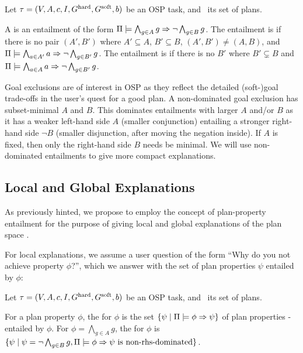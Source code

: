 \begin{definition}
Let $\tau =
(V,\allowbreak A,\allowbreak{\ensuremath{c}},\allowbreak I,\allowbreak G^{\text{\textup{hard}}},\allowbreak G^{\text{\textup{soft}}},\allowbreak{\ensuremath{b}})$
be an OSP task, and \plans\ its set of plans.

A  is an entailment of the form
$\Pi \models \bigwedge_{g \in A} g \Rightarrow \neg \bigwedge_{g \in B}
  g$. 
%
The entailment is  if there is no pair
$(A',B')$ where $A' \subseteq A$, $B' \subseteq B$, $(A',B') \neq
(A,B)$, and $\Pi \models \bigwedge_{a \in A'} a \Rightarrow \neg
  \bigwedge_{g \in B'} g$.
%
The entailment is  if there is no $B'$
where $B' \subsetneq B$ and $\Pi \models \bigwedge_{a \in A}
  a \Rightarrow \neg \bigwedge_{g \in B'} g$.
\end{definition}

Goal exclusions are of interest in OSP as they reflect the detailed
(soft-)goal trade-offs in the user's quest for a good plan. A
non-dominated goal exclusion has subset-minimal $A$ and $B$. This
dominates entailments with larger $A$ and/or $B$ as it has a weaker
left-hand side $A$ (smaller conjunction) entailing a stronger
right-hand side $\neg B$ (smaller disjunction, after moving the
negation inside). If $A$ is fixed, then only the right-hand side $B$
needs be minimal. We will use non-dominated entailments to give more
compact explanations.



\subsection{Local and Global Explanations}

As previously hinted, we propose to employ the concept of
plan-property entailment for the purpose of giving local and global
explanations of the plan space \plans. 

For local explanations, we assume a user question of the form ``Why do
you not achieve property $\phi$?'', which we answer with the set of
plan properties $\psi$ entailed by $\phi$:

\begin{definition}
\label{def:local-explanation}
Let $\tau =
(V,\allowbreak A,\allowbreak{\ensuremath{c}},\allowbreak I,\allowbreak G^{\text{\textup{hard}}},\allowbreak G^{\text{\textup{soft}}},\allowbreak{\ensuremath{b}})$
be an OSP task, and \plans\ its set of plans.

For a plan property $\phi$, the  for
$\phi$ is the set $\{\psi \mid \Pi \models \phi \Rightarrow \psi\}$ of plan
properties \plans-entailed by $\phi$.
%
For $\phi = \bigwedge_{g \in A} g$, the 
for $\phi$ is $\{\psi \mid \psi = \neg \bigwedge_{g \in B} g,
\Pi \models \phi \Rightarrow \psi \text{ is non-rhs-dominated}\}$.
\end{definition}

